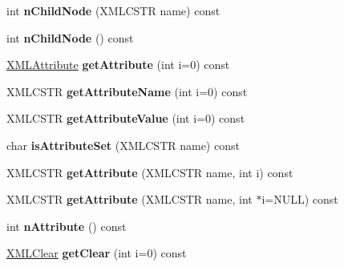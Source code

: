 \begin{DoxyCompactItemize}
\item 
\mbox{\label{struct_x_m_l_node_a37dfb85db6b3e8974474c9a6277fff94}} 
int {\bfseries n\+Child\+Node} (X\+M\+L\+C\+S\+TR name) const
\item 
\mbox{\label{struct_x_m_l_node_a89884092225798f347305956c1ecc62b}} 
int {\bfseries n\+Child\+Node} () const
\item 
\mbox{\label{struct_x_m_l_node_a50cc434e59c5f24f70eec2ae4b0554ab}} 
\hyperlink{struct_x_m_l_attribute}{X\+M\+L\+Attribute} {\bfseries get\+Attribute} (int i=0) const
\item 
\mbox{\label{struct_x_m_l_node_a6710fba2ad2ca7c79c3e5d17a2101e08}} 
X\+M\+L\+C\+S\+TR {\bfseries get\+Attribute\+Name} (int i=0) const
\item 
\mbox{\label{struct_x_m_l_node_a48375d3bbdff5a0f416f668498edd3cb}} 
X\+M\+L\+C\+S\+TR {\bfseries get\+Attribute\+Value} (int i=0) const
\item 
\mbox{\label{struct_x_m_l_node_a0bf031a1bca5c211810eb3420595589e}} 
char {\bfseries is\+Attribute\+Set} (X\+M\+L\+C\+S\+TR name) const
\item 
\mbox{\label{struct_x_m_l_node_a5b66e8469c1f6c3398993e38981ead13}} 
X\+M\+L\+C\+S\+TR {\bfseries get\+Attribute} (X\+M\+L\+C\+S\+TR name, int i) const
\item 
\mbox{\label{struct_x_m_l_node_aed21862233be12773795cf6f3b9feeed}} 
X\+M\+L\+C\+S\+TR {\bfseries get\+Attribute} (X\+M\+L\+C\+S\+TR name, int $\ast$i=N\+U\+LL) const
\item 
\mbox{\label{struct_x_m_l_node_a7980a71afeab26b29c4f1c67659d4214}} 
int {\bfseries n\+Attribute} () const
\item 
\mbox{\label{struct_x_m_l_node_ae1fcdd6a5e7c33b8c3c42ceb695a8a92}} 
\hyperlink{struct_x_m_l_clear}{X\+M\+L\+Clear} {\bfseries get\+Clear} (int i=0) const
\item 
\mbox{\label{struct_x_m_l_node_ac698d5a2e8e8eac2d212d84013c4b0e8}} 

\end{DoxyCompactItemize}
